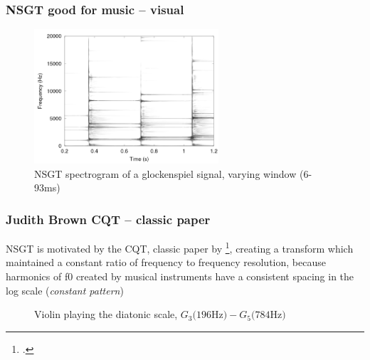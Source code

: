 \documentclass[usenames,dvipsnames]{beamer}
\begin{document}
\begin{frame}
	\frametitle{NSGT good for music -- visual}
	\begin{figure}[ht]
		\centering
		\includegraphics[height=5cm]{./tf_tradeoff_balasz3.png}
		\caption{NSGT spectrogram of a glockenspiel signal, varying window (6-93ms)}
		\label{fig:nsgttradeoff}
	\end{figure}
\end{frame}

\begin{frame}
	\frametitle{Judith Brown CQT -- classic paper}
	NSGT is motivated by the CQT, classic paper by \footcite{jbrown}, creating a transform which maintained a constant ratio of frequency to frequency resolution, because harmonics of f0 created by musical instruments have a consistent spacing in the log scale (\textit{constant pattern})
	\begin{figure}[ht]
		\vspace{-0.75em}
		\centering
		\hspace{0.5em}
		\caption{Violin playing the diatonic scale, $G_{3} \text{(196Hz)} - G_{5} \text{(784Hz)}$}
	\end{figure}
\end{frame}
\end{document}
